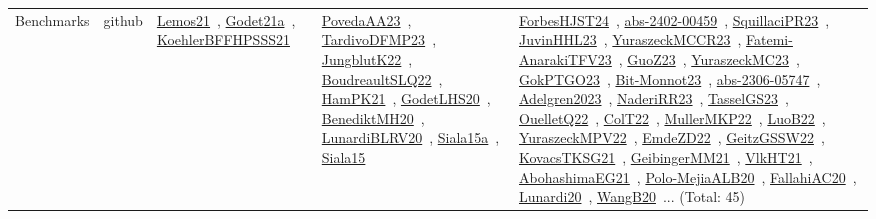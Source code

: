 {\begin{longtable}{lp{3cm}>{\raggedright\arraybackslash}p{6cm}>{\raggedright\arraybackslash}p{6cm}>{\raggedright\arraybackslash}p{8cm}}
Benchmarks & github & \href{../works/Lemos21.pdf}{Lemos21}~\cite{Lemos21}, \href{../works/Godet21a.pdf}{Godet21a}~\cite{Godet21a}, \href{../works/KoehlerBFFHPSSS21.pdf}{KoehlerBFFHPSSS21}~\cite{KoehlerBFFHPSSS21} & \href{../works/PovedaAA23.pdf}{PovedaAA23}~\cite{PovedaAA23}, \href{../works/TardivoDFMP23.pdf}{TardivoDFMP23}~\cite{TardivoDFMP23}, \href{../works/JungblutK22.pdf}{JungblutK22}~\cite{JungblutK22}, \href{../works/BoudreaultSLQ22.pdf}{BoudreaultSLQ22}~\cite{BoudreaultSLQ22}, \href{../works/HamPK21.pdf}{HamPK21}~\cite{HamPK21}, \href{../works/GodetLHS20.pdf}{GodetLHS20}~\cite{GodetLHS20}, \href{../works/BenediktMH20.pdf}{BenediktMH20}~\cite{BenediktMH20}, \href{../works/LunardiBLRV20.pdf}{LunardiBLRV20}~\cite{LunardiBLRV20}, \href{../works/Siala15a.pdf}{Siala15a}~\cite{Siala15a}, \href{../works/Siala15.pdf}{Siala15}~\cite{Siala15} & \href{../works/ForbesHJST24.pdf}{ForbesHJST24}~\cite{ForbesHJST24}, \href{../works/abs-2402-00459.pdf}{abs-2402-00459}~\cite{abs-2402-00459}, \href{../works/SquillaciPR23.pdf}{SquillaciPR23}~\cite{SquillaciPR23}, \href{../works/JuvinHHL23.pdf}{JuvinHHL23}~\cite{JuvinHHL23}, \href{../works/YuraszeckMCCR23.pdf}{YuraszeckMCCR23}~\cite{YuraszeckMCCR23}, \href{../works/Fatemi-AnarakiTFV23.pdf}{Fatemi-AnarakiTFV23}~\cite{Fatemi-AnarakiTFV23}, \href{../works/GuoZ23.pdf}{GuoZ23}~\cite{GuoZ23}, \href{../works/YuraszeckMC23.pdf}{YuraszeckMC23}~\cite{YuraszeckMC23}, \href{../works/GokPTGO23.pdf}{GokPTGO23}~\cite{GokPTGO23}, \href{../works/Bit-Monnot23.pdf}{Bit-Monnot23}~\cite{Bit-Monnot23}, \href{../works/abs-2306-05747.pdf}{abs-2306-05747}~\cite{abs-2306-05747}, \href{../works/Adelgren2023.pdf}{Adelgren2023}~\cite{Adelgren2023}, \href{../works/NaderiRR23.pdf}{NaderiRR23}~\cite{NaderiRR23}, \href{../works/TasselGS23.pdf}{TasselGS23}~\cite{TasselGS23}, \href{../works/OuelletQ22.pdf}{OuelletQ22}~\cite{OuelletQ22}, \href{../works/ColT22.pdf}{ColT22}~\cite{ColT22}, \href{../works/MullerMKP22.pdf}{MullerMKP22}~\cite{MullerMKP22}, \href{../works/LuoB22.pdf}{LuoB22}~\cite{LuoB22}, \href{../works/YuraszeckMPV22.pdf}{YuraszeckMPV22}~\cite{YuraszeckMPV22}, \href{../works/EmdeZD22.pdf}{EmdeZD22}~\cite{EmdeZD22}, \href{../works/GeitzGSSW22.pdf}{GeitzGSSW22}~\cite{GeitzGSSW22}, \href{../works/KovacsTKSG21.pdf}{KovacsTKSG21}~\cite{KovacsTKSG21}, \href{../works/GeibingerMM21.pdf}{GeibingerMM21}~\cite{GeibingerMM21}, \href{../works/VlkHT21.pdf}{VlkHT21}~\cite{VlkHT21}, \href{../works/AbohashimaEG21.pdf}{AbohashimaEG21}~\cite{AbohashimaEG21}, \href{../works/Polo-MejiaALB20.pdf}{Polo-MejiaALB20}~\cite{Polo-MejiaALB20}, \href{../works/FallahiAC20.pdf}{FallahiAC20}~\cite{FallahiAC20}, \href{../works/Lunardi20.pdf}{Lunardi20}~\cite{Lunardi20}, \href{../works/WangB20.pdf}{WangB20}~\cite{WangB20}... (Total: 45)\\

\end{longtable}}
